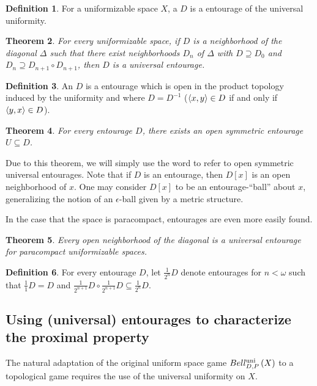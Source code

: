 \documentclass{amsart}
\newtheorem{thm}{Theorem}[section]
\theoremstyle{definition}
\newtheorem{defn}[thm]{Definition}
\begin{document}
\begin{defn}
  For a uniformizable space $X$, a  $D$ is a
  entourage of the universal uniformity.
\end{defn}

\begin{thm}
  For every uniformizable space, if $D$ is a neighborhood of the diagonal
  $\Delta$  such that there exist neighborhoods $D_n$ of $\Delta$ with
  $D\supseteq D_0$ and $D_n \supseteq D_{n+1}\circ D_{n+1}$, then $D$ is a
  universal entourage.
\end{thm}

\begin{defn}
  An  $D$ is a entourage
  which is open in the product topology induced by the uniformity and where
  $D=D^{-1}$ ($\langle x,y\rangle\in D$ if and only if $\langle y,x\rangle\in D$).
\end{defn}

\begin{thm}
  For every entourage $D$, there exists an open symmetric
  entourage $U\subseteq D$.
\end{thm}

Due to this theorem, we will simply use the word  to refer
to open symmetric universal entourages. Note that if $D$ is an
entourage, then $D[x]$ is an open neighborhood of $x$. One may consider
$D[x]$ to be an entourage-``ball'' about $x$, generalizing the notion of
an $\epsilon$-ball given by a metric structure.

In the case that
the space is paracompact, entourages are even more easily found.

\begin{thm}
  Every open neighborhood of the diagonal is a universal entourage for
  paracompact uniformizable spaces.
\end{thm}

\begin{defn}
  For every entourage $D$, let $\frac{1}{2^n}D$ denote entourages for $n<\omega$
  such that $\frac{1}{1}D=D$ and
  $\frac{1}{2^{n+1}}D\circ\frac{1}{2^{n+1}}D\subseteq\frac{1}{2^n}D$.
\end{defn}

\subsection{Using (universal) entourages to characterize the proximal property}

The natural adaptation of the original uniform space game $Bell_{D,P}^{\textrm{uni}}\left({X}\right)$
to a topological game requires the use of the universal uniformity on $X$.
\end{document}
